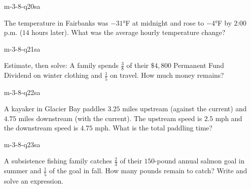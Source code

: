 \begin{practiceQuestion}{m-3-8-q20}{sa}
\begin{questionText}
The temperature in Fairbanks was $-31°$F at midnight and rose to $-4°$F by $2$:$00$ p.m. ($14$ hours later). What was the average hourly temperature change?
\end{questionText}
\end{practiceQuestion}

\begin{practiceQuestion}{m-3-8-q21}{sa}
\begin{questionText}
Estimate, then solve: A family spends $\frac{3}{8}$ of their $\$4{,}800$ Permanent Fund Dividend on winter clothing and $\frac{1}{5}$ on travel. How much money remains?
\end{questionText}
\end{practiceQuestion}

\begin{practiceQuestion}{m-3-8-q22}{sa}
\begin{questionText}
A kayaker in Glacier Bay paddles $3.25$ miles upstream (against the current) and $4.75$ miles downstream (with the current). The upstream speed is $2.5$ mph and the downstream speed is $4.75$ mph. What is the total paddling time?
\end{questionText}
\end{practiceQuestion}

\begin{practiceQuestion}{m-3-8-q23}{sa}
\begin{questionText}
A subsistence fishing family catches $\frac{2}{3}$ of their $150$-pound annual salmon goal in summer and $\frac{1}{5}$ of the goal in fall. How many pounds remain to catch? Write and solve an expression.
\end{questionText}
\end{practiceQuestion}

